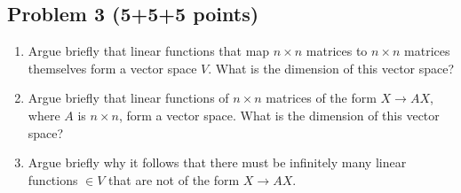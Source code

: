 \documentclass{article}
\begin{document}
\subsection*{Problem 3 (5+5+5 points)}


\begin{enumerate}[label=(\alph*)]

\item
Argue briefly that linear functions that map $n \times n$ matrices to $n \times n$ matrices themselves form
a vector space $V$.  What is the dimension of this vector space?

\item
Argue briefly that linear functions of 
$n \times n$ matrices of the form $ X \rightarrow AX$, where $A$ is $n \times n$,  form a vector space.
What is the dimension of this vector space?

\item
Argue briefly why it follows that there must be infinitely many linear functions $\in V$
that are not of the form $X \rightarrow AX$.

\end{enumerate}
\end{document}
